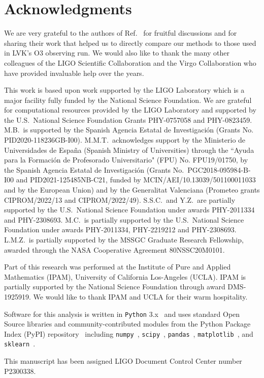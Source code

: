 \section*{Acknowledgments}

We are very grateful to the authors of Ref.~\cite{Chatterjee:2019avs} for fruitful discussions and for sharing their work that helped us to directly compare
our methods to those used in \ac{LVK}'s \ac{O3} observing run. We would also like to thank the many other colleagues of the LIGO Scientific Collaboration and
the Virgo Collaboration who have provided invaluable help over the years.

This work is based upon work supported by the LIGO Laboratory which is a major facility fully funded by the National Science Foundation. We are grateful for computational resources provided
by the LIGO Laboratory and supported by the U.S.\ National Science Foundation Grants PHY-0757058 and PHY-0823459. M.B.\ is supported by the Spanish Agencia Estatal de Investigaci\'on (Grants
No. PID2020-118236GB-I00). M.M.T.\ acknowledges support by the Ministerio de Universidades de Espa\~na (Spanish Ministry of Universities) through the ``Ayuda para la Formaci\'on de
Profesorado Universitario" (FPU) No. FPU19/01750, by the Spanish Agencia Estatal de Investigaci\'on (Grants No.\ PGC2018-095984-B-I00 and PID2021-125485NB-C21, funded by MCIN/AEI/10.13039/501100011033 and by the European Union) and by the Generalitat
Valenciana (Prometeo grants CIPROM/2022/13 and CIPROM/2022/49). S.S.C.\ and Y.Z.\ are partially supported by the U.S.\ National Science Foundation under awards PHY-2011334 and PHY-2308693.
M.C.\ is partially supported by the U.S.\ National Science Foundation under awards PHY-2011334, PHY-2219212 and PHY-2308693. L.M.Z.\ is partially supported by the MSSGC Graduate Research
Fellowship, awarded through the NASA Cooperative Agreement 80NSSC20M0101.

 Part of this research was performed at the Institute of Pure and Applied Mathematics (IPAM),  University of California Los-Angeles (UCLA). IPAM is partially supported by the National Science
Foundation through award DMS-1925919. We would like to thank IPAM and UCLA for their warm hospitality. 

Software for this analysis is written in \texttt{Python} 3.x~\cite{python3} and
uses standard Open Source libraries and community-contributed modules from the
Python Package Index (PyPI) repository~\cite{pypi} including
\texttt{numpy}~\cite{harris2020array}, \texttt{scipy}~\cite{2020SciPy-NMeth},
\texttt{pandas}~\cite{reback2020pandas,mckinney-proc-scipy-2010},
\texttt{matplotlib}~\cite{Hunter:2007ouj}, and \texttt{sklearn}~\cite{scikit-learn}.

This manuscript has been assigned LIGO Document Control Center number P2300338.





